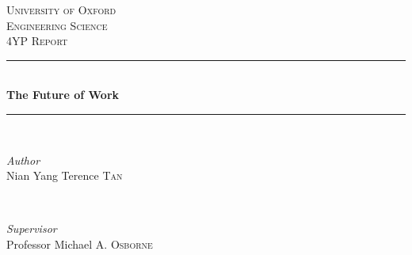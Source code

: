 \documentclass[11pt]{article}
\begin{document}
\begin{titlepage} %
	\newcommand{\HRule}{\rule{\linewidth}{0.5mm}} %
	
	\center %
	
	
	\textsc{\LARGE University of Oxford}\\[1.5cm] %
	
	\textsc{\Large Engineering Science}\\[0.5cm] %
	
	\textsc{\large 4YP Report}\\[0.5cm] %
	
	
	\HRule\\[0.4cm]
	
	{\huge\bfseries The Future of Work}\\[0.4cm] %
	
	\HRule\\[1.5cm]
	
	
	\begin{minipage}{0.4\textwidth}
		\begin{flushleft}
			\large
			\textit{Author}\\
			Nian Yang Terence \textsc{Tan} %
		\end{flushleft}
	\end{minipage}
	~
	\begin{minipage}{0.4\textwidth}
		\begin{flushright}
			\large
			\textit{Supervisor}\\
			Professor Michael A. \textsc{Osborne} %
		\end{flushright}
	\end{minipage}
	
	

\end{titlepage}
\end{document}
